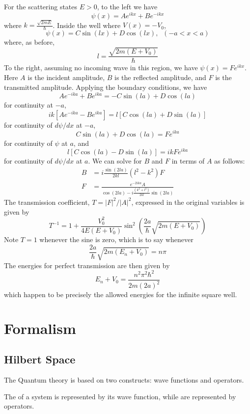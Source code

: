 \documentclass[12pt, a4paper, oneside, openright, titlepage]{book}
\begin{document}
For the scattering states $E > 0$, to the left we have $$\psi(x) = Ae^{ikx} + Be^{-ikx}$$
where $k = \frac{\sqrt{2mE}}{\hbar}$. Inside the well where $V(x) = -V_0$, $$\psi(x) = C\sin(lx) + D\cos(lx),\;\;(-a < x < a)$$
where, as before, \begin{equation*}
    l = \frac{\sqrt{2m(E+V_0)}}{\hbar}
\end{equation*}
To the right, assuming no incoming wave in this region, we have $\psi(x) = Fe^{ikx}$. Here $A$ is the incident amplitude, $B$ is the reflected amplitude, and $F$ is the transmitted amplitude. Applying the boundary conditions, we have $$Ae^{-ika} + Be^{ika} = -C\sin(la) + D\cos(la)$$ 
for continuity at $-a$, $$ik\left[Ae^{-ika} -Be^{ika}\right] = l[C\cos(la)+D\sin(la)]$$
for continuity of $d\psi/dx$ at $-a$, $$C\sin(la)+D\cos(la) = Fe^{ika}$$
for continuity of $\psi$ at $a$, and $$l[C\cos(la)-D\sin(la)] = ikFe^{ika}$$
for continuity of $d\psi/dx$ at $a$.
We can solve for $B$ and $F$ in terms of $A$ as follows: \begin{align*}
    B &= i\frac{\sin(2la)}{2kl}(l^2-k^2)F \\
    F &= \frac{e^{-2ika}A}{\cos(2la)-i\frac{(k^2+l^2)}{2kl}\sin(2la)}
\end{align*}
The transmission coefficient, $T= |F|^2/|A|^2$, expressed in the original variables is given by $$T^{-1} = 1+\frac{V_0^2}{4E(E+V_0)}\sin^2\left(\frac{2a}{\hbar}\sqrt{2m(E+V_0)}\right)$$
Note $T = 1$ whenever the sine is zero, which is to say whenever $$\frac{2a}{\hbar}\sqrt{2m(E_n+V_0)} = n\pi$$
The energies for perfect transmission are then given by \begin{equation*}
    E_n+V_0 =\frac{n^2\pi^2\hbar^2}{2m(2a)^2}
\end{equation*}
which happen to be precisely the allowed energies for the infinite square well.


\chapter{Formalism}

\section{Hilbert Space}

The Quantum theory is based on two constructs: wave functions and operators. 

\begin{defn}
    The  of a system is represented by its wave function, while  are represented by operators.
\end{defn}
\end{document}
